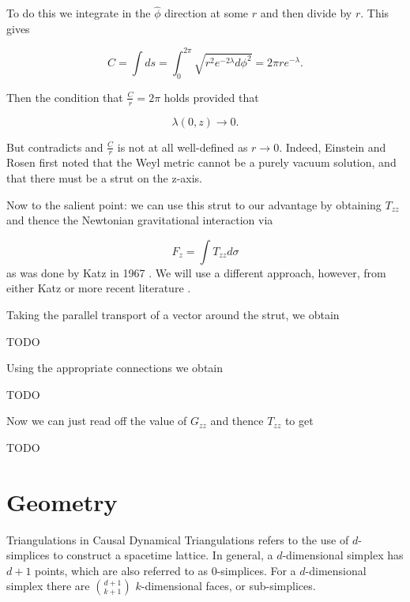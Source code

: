 \documentclass[12pt]{article}
\begin{document}
To do this we integrate in the $\hat{\phi}$ direction at
some $r$ and then divide by $r$. This gives

\begin{equation}
  \label{eq:phi-hat-length}
  C=\int ds =
  \int_0^{2\pi}\sqrt{r^2e^{-2\lambda}d\phi^2}={2\pi re^{-\lambda}}.
\end{equation}

Then the condition that $\frac{C}{r}=2\pi$ holds provided that

\begin{equation}
	\label{eq:lambda-elem-flat}
	\lambda(0,z)\rightarrow 0.
\end{equation} 

But  contradicts  and $\frac{C}{r}$ is not at all well-defined as $r\rightarrow 0$. Indeed, Einstein and Rosen \cite{einstein-rosen-1936} first noted that the Weyl metric cannot be a purely vacuum solution, and that there must be a strut on the z-axis.

Now to the salient point: we can use this strut to our advantage by obtaining $T_{zz}$ and thence the Newtonian gravitational interaction via

\begin{equation}
	\label{eq:F_z}
	F_{z}=\int T_{zz}d\sigma
\end{equation}
as was done by Katz in 1967 \cite{katz1967derivation}. We will use a different approach, however, from either Katz or more recent literature \cite{letelier_superposition_1997}.

Taking the parallel transport of a vector around the strut, we obtain

TODO

Using the appropriate connections we obtain

TODO

Now we can just read off the value of $G_{zz}$ and thence $T_{zz}$ to get

TODO

\section{Geometry}

Triangulations in Causal Dynamical Triangulations refers to the use of $d$-simplices to construct a spacetime lattice. In general, a $d$-dimensional simplex has $d+1$ points, which are also referred to as $0$-simplices. For a $d$-dimensional simplex there are $\binom{d+1}{k+1}$ $k$-dimensional faces, or sub-simplices.
\end{document}
